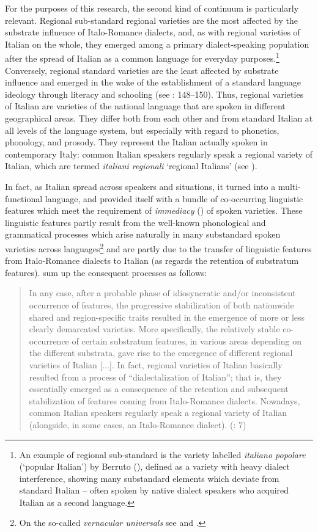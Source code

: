 For the purposes of this research, the second kind of continuum is particularly relevant. Regional sub-standard regional varieties are the most affected by the substrate influence of Italo-Romance dialects, and, as with regional varieties of Italian on the whole, they emerged among a primary dialect-speaking population after the spread of Italian as a common language for everyday purposes.\footnote{An example of regional sub-standard is the variety labelled \textit{italiano popolare} (‘popular Italian’) by Berruto (\citeyear{Berruto2012}), defined as a variety with heavy dialect interference, showing many substandard elements which deviate from standard Italian – often spoken by native dialect speakers who acquired Italian as a second language. } Conversely, regional standard varieties are the least affected by substrate influence and emerged in the wake of the establishment of a standard language ideology through literacy and schooling (see \citealt{Regis2017}: 148–150). Thus, regional varieties of Italian are varieties of the national language that are spoken in different geographical areas. They differ both from each other and from standard Italian at all levels of the language system, but especially with regard to phonetics, phonology, and prosody. They represent the Italian actually spoken in contemporary Italy: common Italian speakers regularly speak a regional variety of Italian, which are termed \textit{italiani regionali} ‘regional Italians’ (see \citealt{Cerruti2011}).

In fact, as Italian spread across speakers and situations, it turned into a multi-functional language, and provided itself with a bundle of co-occurring linguistic features which meet the requirement of \textit{immediacy} (\citealt{KochOesterreicher1985}) of spoken varieties. These linguistic features partly result from the well-known phonological and grammatical processes which arise naturally in many substandard spoken varieties across languages\footnote{On the so-called \textit{vernacular universals} see \citet{Chambers2004} and \citet{Trudgill2011}.} and are partly due to the transfer of linguistic features from Italo-Romance dialects to Italian (as regards the retention of substratum features). \citet{CerrutiEtAl2017} sum up the consequent processes as follows:

\begin{quote}
In any case, after a probable phase of idiosyncratic and/or inconsistent occurrence of features, the progressive stabilization of both nationwide shared and region-specific traits resulted in the emergence of more or less clearly demarcated varieties. More specifically, the relatively stable co-occurrence of certain substratum features, in various areas depending on the different substrata, gave rise to the emergence of different regional varieties of Italian [...]. In fact, regional varieties of Italian basically resulted from a process of “dialectalization of Italian”; that is, they essentially emerged as a consequence of the retention and subsequent stabilization of features coming from Italo-Romance dialects. Nowadays, common Italian speakers regularly speak a regional variety of Italian (alongside, in some cases, an Italo-Romance dialect). (\citealt{CerrutiEtAl2017}: 7)
\end{quote}

